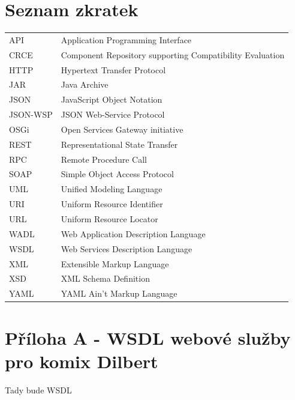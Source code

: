\documentclass[czech,DP]{thesiskiv}
\newcommand\nomenclature[2]{#1 & #2 \\}
\begin{document}
\chapter*{Seznam zkratek}

\begin{longtable}{@{}p{3cm}@{}p{\dimexpr\textwidth-1cm\relax}@{}}
	\nomenclature{API}{Application Programming Interface}
	\nomenclature{CRCE}{Component Repository supporting Compatibility Evaluation}
	\nomenclature{HTTP}{Hypertext Transfer Protocol}
	\nomenclature{JAR}{Java Archive}
	\nomenclature{JSON}{JavaScript Object Notation}
	\nomenclature{JSON-WSP}{JSON Web-Service Protocol}
	\nomenclature{OSGi}{Open Services Gateway initiative}
	\nomenclature{REST}{Representational State Transfer}
	\nomenclature{RPC}{Remote Procedure Call}
	\nomenclature{SOAP}{Simple Object Access Protocol}
	\nomenclature{UML}{Unified Modeling Language}
	\nomenclature{URI}{Uniform Resource Identifier}
	\nomenclature{URL}{Uniform Resource Locator}
	\nomenclature{WADL}{Web Application Description Language}
	\nomenclature{WSDL}{Web Services Description Language}
	\nomenclature{XML}{Extensible Markup Language}
	\nomenclature{XSD}{XML Schema Definition}
	\nomenclature{YAML}{YAML Ain't Markup Language}
\end{longtable}

\chapter*{Příloha A - WSDL webové služby pro komix Dilbert}
Tady bude WSDL
\end{document}
